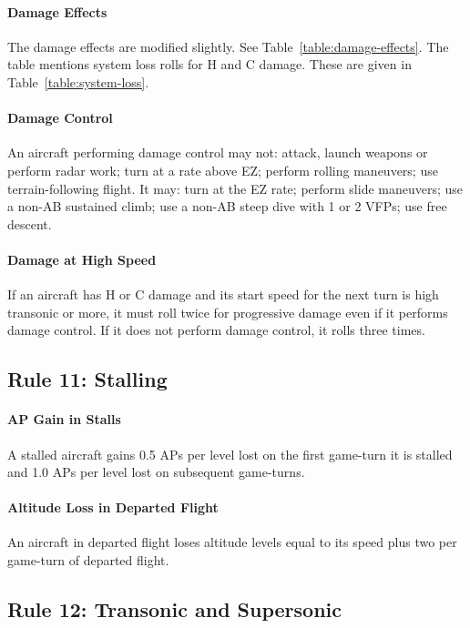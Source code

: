 \documentclass[10pt]{article}
\begin{document}
\paragraph{Damage Effects} The damage effects are modified slightly. See Table~\ref{table:damage-effects}. The table mentions system loss rolls for H and C damage. These are given in Table~\ref{table:system-loss}. 

\paragraph{Damage Control} An aircraft performing damage control may not: attack, launch weapons or perform radar work; turn at a rate above EZ; perform rolling maneuvers; use terrain-following flight. It may: turn at the EZ rate; perform slide maneuvers; use a non-AB sustained climb; use a non-AB steep dive with 1 or 2 VFPs; use free descent.

\paragraph{Damage at High Speed} If an aircraft has H or C damage and its start speed for the next turn is high transonic or more, it must roll twice for progressive damage even if it performs damage control. If it does not perform damage control, it rolls three times.

\subsection{Rule 11: Stalling}

\paragraph{AP Gain in Stalls} A stalled aircraft gains 0.5 APs per level lost on the first game-turn it is stalled and 1.0 APs per level lost on subsequent game-turns.

\paragraph{Altitude Loss in Departed Flight} An aircraft in departed flight loses altitude levels equal to its speed plus two per game-turn of departed flight.

\subsection{Rule 12: Transonic and Supersonic}
\end{document}
